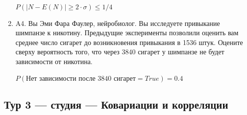\documentclass[12pt]{article}
\def \P{P}
\newenvironment{problem}{}{}
\newenvironment{sol}{}{} %
\begin{document}
\begin{enumerate}
\begin{problem}
\begin{sol}
$\P(\vert N-E(N) \vert \geq 2 \cdot \sigma) \leq 1/4$
\end{sol}
\end{problem}

\begin{problem}
\item[A4.] Вы Эми Фара Фаулер, нейробиолог. Вы исследуете привыкание шимпанзе к никотину. Предыдущие эксперименты позволили оценить вам среднее число сигарет до возникновения привыкания в 1536 штук. Оцените сверху вероятность того, что через 3840 сигарет у шимпанзе не будет зависимости от никотина.

\begin{sol}
$\P(\text{Нет зависимости после 3840 сигарет}=True)=0.4$
\end{sol}
\end{problem}
\end{enumerate}


\newpage
\subsection{Тур 3 — студия — Ковариации и корреляции}
\end{document}
